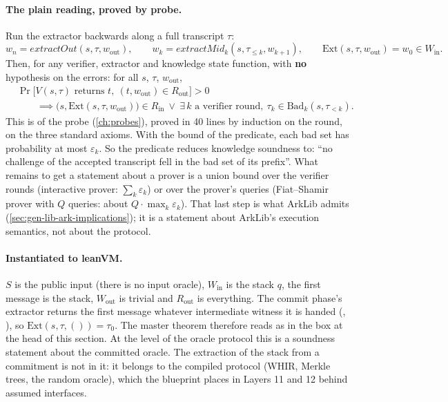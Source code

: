 \paragraph{The plain reading, proved by probe.} Run the extractor backwards along a full
transcript $\tau$:
\[
  w_n = \mathit{extractOut}(s, \tau, w_{\mathrm{out}}), \qquad
  w_k = \mathit{extractMid}_k(s, \tau_{\le k}, w_{k+1}), \qquad
  \mathrm{Ext}(s, \tau, w_{\mathrm{out}}) = w_0 \in W_{\mathrm{in}}.
\]
Then, for any verifier, extractor and knowledge state function, with \textbf{no} hypothesis on the
errors: for all $s$, $\tau$, $w_{\mathrm{out}}$,
\[
\begin{aligned}
  &\Pr\bigl[V(s,\tau) \text{ returns } t,\ (t, w_{\mathrm{out}}) \in R_{\mathrm{out}}\bigr] > 0 \\
  &\qquad\implies
  \bigl(s, \mathrm{Ext}(s, \tau, w_{\mathrm{out}})\bigr) \in R_{\mathrm{in}}
  \ \vee\ \exists\, k \text{ a verifier round},\ \tau_k \in \mathrm{Bad}_k(s, \tau_{<k}).
\end{aligned}
\]
This is \allowbreak{}\allowbreak{}\allowbreak{}\allowbreak{} of the probe 
(\cref{ch:probes}), proved in 40 lines by induction on the round, on the three standard axioms.
With the bound of the predicate, each bad set has probability at most $\varepsilon_k$. So the
predicate reduces knowledge soundness to: \enquote{no challenge of the accepted transcript fell in
the bad set of its prefix}. What remains to get a statement about a prover is a union bound over
the verifier rounds (interactive prover: $\sum_k \varepsilon_k$) or over the prover's queries
(Fiat--Shamir prover with $Q$ queries: about $Q \cdot \max_k \varepsilon_k$). That last step is
what ArkLib admits (\cref{sec:gen-lib-ark-implications}); it is a statement about ArkLib's
execution semantics, not about the protocol.

\paragraph{Instantiated to leanVM.} $S$ is the public input (there is no input oracle),
$W_{\mathrm{in}}$ is the stack $q$, the first message is the stack, $W_{\mathrm{out}}$ is trivial
and $R_{\mathrm{out}}$ is everything. The commit phase's extractor returns the first message
whatever intermediate witness it is handed (,
\allowbreak{}\allowbreak{}\allowbreak{}), so
$\mathrm{Ext}(s, \tau, ()) = \tau_0$. The master theorem therefore reads as in the box at the head
of this section. At the level of the oracle protocol this is a soundness statement about the
committed oracle. The extraction of the stack from a commitment is not in it: it belongs to the
compiled protocol (WHIR, Merkle trees, the random oracle), which the blueprint places in Layers 11
and 12 behind assumed interfaces.

